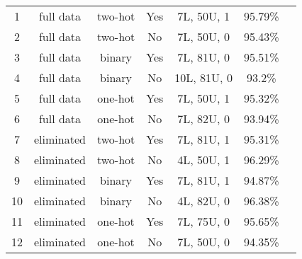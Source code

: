 \begin{center}
\begin{tabular}{c c c c c c c}
   \small{1} & \small{full data} & \small{two-hot} & \small{Yes} & \small{7L, 50U, 1} &\small{95.79\%}\\ 
   \small{2} & \small{full data} & \small{two-hot} & \small{No} & \small{7L, 50U, 0} & \small{95.43\%}\\ 
   \small{3} & \small{full data} & \small{binary} & \small{Yes} & \small{7L, 81U, 0} & \small{95.51\%}\\ 
   \small{4} & \small{full data} & \small{binary} & \small{No} & \small{10L, 81U, 0} & \small{93.2\%}\\ 
   \small{5} & \small{full data} & \small{one-hot} & \small{Yes} & \small{7L, 50U, 1} & \small{95.32\%}\\ 
   \small{6} & \small{full data} & \small{one-hot} & \small{No}  &\small{7L, 82U, 0} & \small{93.94\%}\\ 
   \small{7} & \small{eliminated} & \small{two-hot} & \small{Yes} & \small{7L, 81U, 1} & \small{95.31\%}\\
   \small{8} & \small{eliminated} & \small{two-hot} & \small{No}  &\small{4L, 50U, 1} & \small{96.29\%}\\ 
   \small{9} & \small{eliminated} & \small{binary} & \small{Yes} & \small{7L, 81U, 1} & \small{94.87\%}\\ 
   \small{10} & \small{eliminated} & \small{binary} & \small{No} & \small{4L, 82U, 0} & \small{96.38\%}\\ 
   \small{11} & \small{eliminated} & \small{one-hot} & \small{Yes} & \small{7L, 75U, 0} & \small{95.65\%}\\ 
   \small{12} & \small{eliminated} & \small{one-hot} & \small{No} & \small{7L, 50U, 0} & \small{94.35\%}\\ 



\end{tabular}
\end{center}
